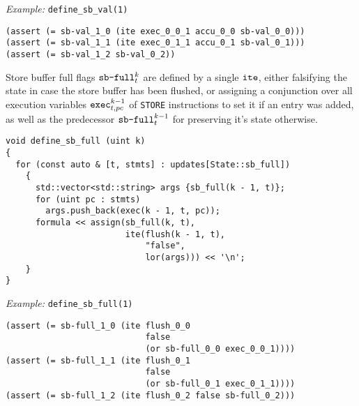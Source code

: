 \noindent
\emph{Example:} \lstinline[style=c++]{define_sb_val(1)}

\begin{lstlisting}[language=SMTLib]
(assert (= sb-val_1_0 (ite exec_0_0_1 accu_0_0 sb-val_0_0)))
(assert (= sb-val_1_1 (ite exec_0_1_1 accu_0_1 sb-val_0_1)))
(assert (= sb-val_1_2 sb-val_0_2))
\end{lstlisting}


\noindent
Store buffer full flags $\texttt{sb-full}^k_t$ are defined by a single
$\texttt{ite}$, either falsifying the state in case the store buffer has been flushed,
or assigning a conjunction over all execution variables $\texttt{exec}^{k - 1}_{t, pc}$ of \lstinline[language={[concubine]Assembler}]{STORE} instructions to set it if an entry was added, as well as the predecessor $\texttt{sb-full}^{k - 1}_t$ for preserving it's state otherwise.

\begin{lstlisting}[style=c++]
void define_sb_full (uint k)
{
  for (const auto & [t, stmts] : updates[State::sb_full])
    {
      std::vector<std::string> args {sb_full(k - 1, t)};
      for (uint pc : stmts)
        args.push_back(exec(k - 1, t, pc));
      formula << assign(sb_full(k, t),
                        ite(flush(k - 1, t),
                            "false",
                            lor(args))) << '\n';
    }
}
\end{lstlisting}

\noindent
\emph{Example:} \lstinline[style=c++]{define_sb_full(1)}

\begin{lstlisting}[language=SMTLib]
(assert (= sb-full_1_0 (ite flush_0_0
                            false
                            (or sb-full_0_0 exec_0_0_1))))
(assert (= sb-full_1_1 (ite flush_0_1
                            false
                            (or sb-full_0_1 exec_0_1_1))))
(assert (= sb-full_1_2 (ite flush_0_2 false sb-full_0_2)))
\end{lstlisting}

